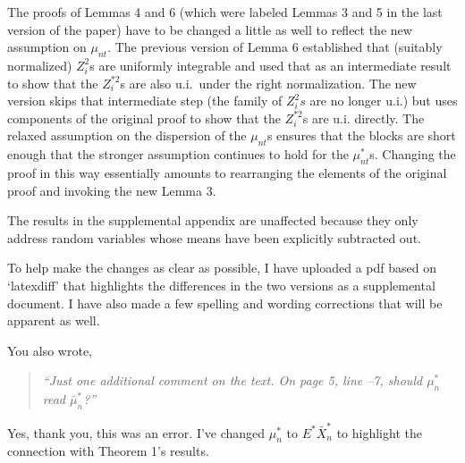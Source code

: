 \documentclass[12pt]{article}
\begin{document}
The proofs of Lemmas 4 and 6 (which were labeled Lemmas 3 and 5 in the
last version of the paper) have to be changed a little as well to
reflect the new assumption on $\mu_{nt}$. The previous version of
Lemma 6 established that (suitably normalized) $Z_i^2$s are uniformly
integrable and used that as an intermediate result to show that the
$Z_i^{*2}$s are also u.i.\ under the right normalization. The new
version skips that intermediate step (the family of $Z_i^2s$ are no
longer u.i.) but uses components of the original proof to show that
the $Z_i^{*2}$s are u.i. directly. The relaxed assumption on the
dispersion of the $\mu_{nt}$s ensures that the blocks are short
enough that the stronger assumption continues to hold for the
$\mu_{nt}^*$s.
Changing the proof in this way essentially amounts to rearranging the
elements of the original proof and invoking the new Lemma 3.

The results in the supplemental appendix are unaffected because they
only address random variables whose means have been explicitly
subtracted out.

To help make the changes as clear as possible, I have uploaded a
pdf based on `latexdiff' that highlights the differences in the
two versions as a supplemental document. I have also made a few
spelling and wording corrections that will be apparent as well.

You also wrote,
\begin{quotation}
  \noindent%
  \textit{``Just one additional comment on the text. On page
    5, line --7, should $\mu_n^*$ read $\bar{\mu}_n^*$?''}
\end{quotation}
\noindent%
Yes, thank you, this was an error. I've changed $\mu_n^*$ to
$E^* \bar X_n^*$ to highlight the connection with Theorem 1's results.
\end{document}
